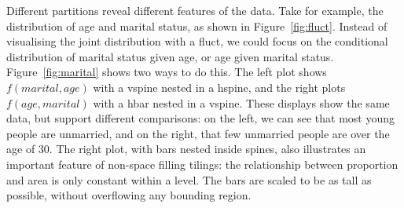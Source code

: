 \documentclass[journal]{vgtc}
\begin{document}
Different partitions reveal different features of the data. Take for example, the distribution of age and marital status, as shown in Figure~\ref{fig:fluct}. Instead of visualising the joint distribution with a fluct, we could focus on the conditional distribution of marital status given age, or age given marital status. Figure~\ref{fig:marital} shows two ways to do this. The left plot shows $f(marital, age)$ with a vspine nested in a hspine, and the right plots $f(age, marital)$ with a hbar nested in a vspine. These displays show the same data, but support different comparisons: on the left, we can see that most young people are unmarried, and on the right, that few unmarried people are over the age of 30. The right plot, with bars nested inside spines, also illustrates an important feature of non-space filling tilings: the relationship between proportion and area is only constant within a level. The bars are scaled to be as tall as possible, without overflowing any bounding region.
\end{document}
